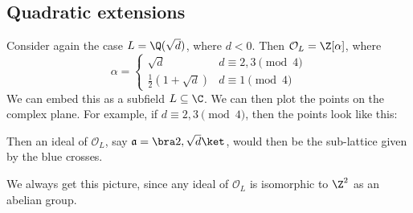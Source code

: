\documentclass[a4paper]{article}
\begin{document}
\subsection*{Quadratic extensions}
Consider again the case $L = \Q(\sqrt{d})$, where $d < 0$. Then $\mathcal{O}_L = \Z[\alpha]$, where
\[
  \alpha =
  \begin{cases}
    \sqrt{d} & d \equiv 2, 3\pmod 4\\
    \frac{1}{2}(1 + \sqrt{d})& d \equiv 1 \pmod 4
  \end{cases}
\]
We can embed this as a subfield $L \subseteq \C$. We can then plot the points on the complex plane. For example, if $d \equiv 2, 3 \pmod 4$, then the points look like this:
\begin{center}
\end{center}
Then an ideal of $\mathcal{O}_L$, say $\mathfrak{a} = \bra 2, \sqrt{d}\ket$, would then be the sub-lattice given by the blue crosses.
\begin{center}
\end{center}
We always get this picture, since any ideal of $\mathcal{O}_L$ is isomorphic to $\Z^2$ as an abelian group.
\end{document}
